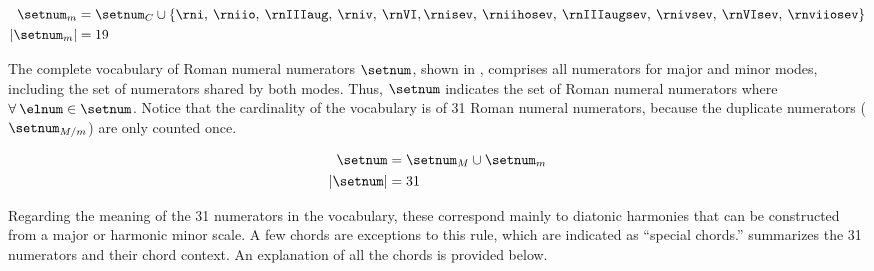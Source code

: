 \begin{equation}
    \label{eq:minor_numerators}
    \begin{split}
    \setnum_{m} &= \setnum_{C} \cup  \{ \rni, \: \rniio, \: 
    \rnIIIaug, \: \rniv, \: \rnVI, \rnisev, \: \rniihosev, \: 
    \rnIIIaugsev, \: \rnivsev, \: \rnVIsev, \: \rnviiosev \} \\
    | \setnum_{m} | &= 19
    \end{split}
\end{equation}

The complete vocabulary of Roman numeral numerators
$\setnum$, shown in , comprises all
numerators for major and minor modes, including the set of
numerators shared by both modes. Thus, $\setnum$ indicates
the set of Roman numeral numerators where $\forall \: \elnum
\in \setnum$. Notice that the cardinality of the vocabulary
is of 31 Roman numeral numerators, because the duplicate
numerators ($\setnum_{M/m}$) are only counted once.

\begin{equation}
    \label{eq:all_numerators}
    \begin{split}
    \setnum &= \setnum_{M} \cup \setnum_{m} \\
    | \setnum | &= 31
    \end{split}
\end{equation}

Regarding the meaning of the 31 numerators in the
vocabulary, these correspond mainly to diatonic harmonies
that can be constructed from a major or harmonic minor
scale. A few chords are exceptions to this rule, \: which
are indicated as ``special chords.'' 
summarizes the 31 numerators and their chord context. An
explanation of all the chords is provided below.



